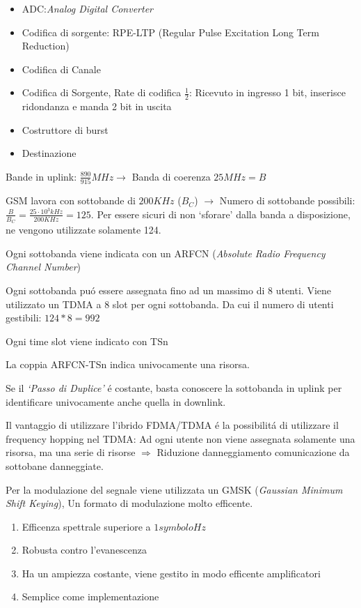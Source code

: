 \documentclass{article}
\begin{document}
\begin{itemize}
    \item ADC:\@\textit{Analog Digital Converter}
    \item Codifica di sorgente: RPE-LTP (Regular Pulse Excitation Long Term Reduction)
    \item Codifica di Canale
    \item Codifica di Sorgente, Rate di codifica $\frac{1}{2}$: Ricevuto in ingresso 1 bit, inserisce ridondanza e manda 2 bit in uscita
    \item Costruttore di burst
    \item Destinazione
\end{itemize}

Bande in uplink: $\frac{890}{915} MHz \rightarrow$ Banda di coerenza $25MHz = B$

GSM lavora con sottobande di $200 KHz$ ($B_C$) $\rightarrow$ Numero di sottobande possibili: $\frac{B}{B_C} = \frac{25\cdot10^3 kHz}{200KHz} = 125$. Per essere sicuri di non `sforare' dalla banda a disposizione, ne vengono utilizzate solamente 124.

Ogni sottobanda viene indicata con un ARFCN (\textit{Absolute Radio Frequency Channel Number})

Ogni sottobanda pu\'o essere assegnata fino ad un massimo di 8 utenti. Viene utilizzato un TDMA a 8 slot per ogni sottobanda. Da cui il numero di utenti gestibili: $124*8 = 992$

Ogni time slot viene indicato con TSn

La coppia ARFCN-TSn indica univocamente una risorsa.

Se il \textit{`Passo di Duplice'} \'e costante, basta conoscere la sottobanda in uplink per identificare univocamente anche quella in downlink.

Il vantaggio di utilizzare l'ibrido FDMA/TDMA \'e la possibilit\'a di utilizzare il frequency hopping nel TDMA: Ad ogni utente non viene assegnata solamente una risorsa, ma una serie di risorse $\Rightarrow$ Riduzione danneggiamento comunicazione da sottobane danneggiate.

Per la modulazione del segnale viene utilizzata un GMSK (\textit{Gaussian Minimum Shift Keying}), Un formato di modulazione molto efficente.
\begin{enumerate}
    \item Efficenza spettrale superiore a $1 \textit{symbolo}{Hz}$
    \item Robusta contro l'evanescenza
    \item Ha un ampiezza costante, viene gestito in modo efficente amplificatori
    \item Semplice come implementazione
\end{enumerate}
\end{document}
